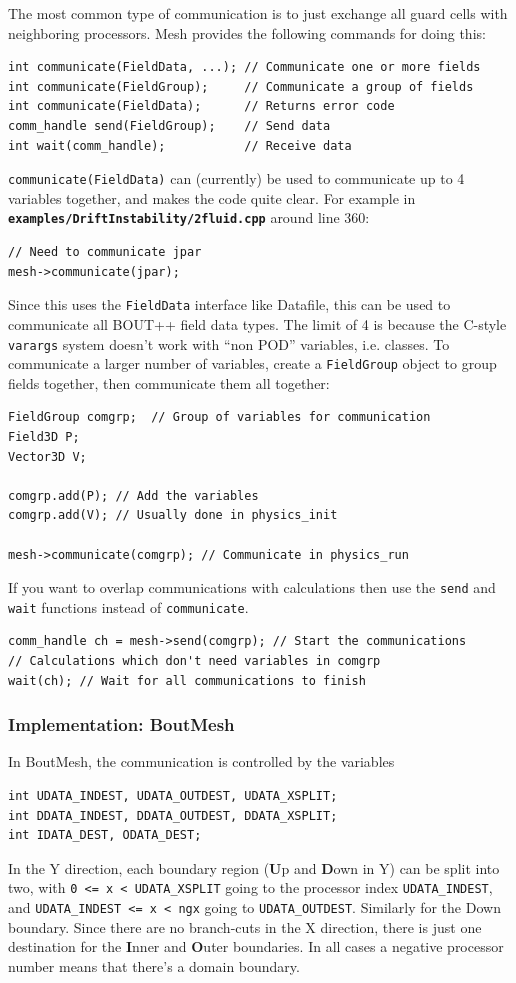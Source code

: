 \documentclass[12pt]{article}
\newcommand{\code}[1]{\texttt{#1}}
\newcommand{\file}[1]{\texttt{\bf #1}}
\begin{document}
The most common type of communication is to just exchange all
guard cells with neighboring processors. Mesh provides the following
commands for doing this:
\begin{lstlisting}
int communicate(FieldData, ...); // Communicate one or more fields
int communicate(FieldGroup);     // Communicate a group of fields
int communicate(FieldData);      // Returns error code
comm_handle send(FieldGroup);    // Send data
int wait(comm_handle);           // Receive data
\end{lstlisting}
\code{communicate(FieldData)} can (currently) be used to communicate
up to 4 variables together, and makes the code quite clear. For example in
\file{examples/DriftInstability/2fluid.cpp} around line 360:
\begin{lstlisting}
// Need to communicate jpar
mesh->communicate(jpar);
\end{lstlisting}
Since this uses the \code{FieldData} interface like Datafile, this can
be used to communicate all BOUT++ field data types. The limit of 4 is
because the C-style \code{varargs} system doesn't work with ``non POD''
variables, i.e. classes. To communicate a larger number of variables,
create a \code{FieldGroup} object to group fields together, then communicate
them all together:
\begin{lstlisting}
FieldGroup comgrp;  // Group of variables for communication
Field3D P;
Vector3D V;

comgrp.add(P); // Add the variables
comgrp.add(V); // Usually done in physics_init

mesh->communicate(comgrp); // Communicate in physics_run
\end{lstlisting}

If you want to overlap communications with calculations then
use the \code{send} and \code{wait} functions instead of \code{communicate}.
\begin{lstlisting}
comm_handle ch = mesh->send(comgrp); // Start the communications
// Calculations which don't need variables in comgrp
wait(ch); // Wait for all communications to finish
\end{lstlisting}

\subsubsection{Implementation: BoutMesh}

In BoutMesh, the communication is controlled by the variables
\begin{lstlisting}
int UDATA_INDEST, UDATA_OUTDEST, UDATA_XSPLIT;
int DDATA_INDEST, DDATA_OUTDEST, DDATA_XSPLIT;
int IDATA_DEST, ODATA_DEST;
\end{lstlisting}
In the Y direction, each boundary region ({\bf U}p and {\bf D}own in Y) 
can be split into two, with \code{0 <= x < UDATA\_XSPLIT} going to
the processor index \code{UDATA\_INDEST}, and \code{UDATA\_INDEST <= x < ngx}
going to \code{UDATA\_OUTDEST}. Similarly for the Down boundary.
Since there are no branch-cuts in the X direction, there is just one
destination for the {\bf I}nner and {\bf O}uter boundaries.
In all cases a negative processor number means that there's a domain boundary.
\end{document}

